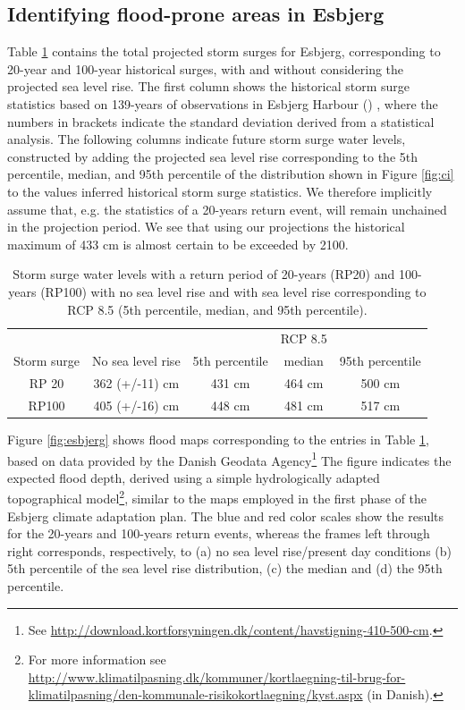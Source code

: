 \documentclass[draft,linenumbers]{agujournal}
\begin{document}
\subsection{Identifying flood-prone areas in Esbjerg}
Table \ref{tab:stormsurge} contains the total projected storm surges for Esbjerg, corresponding to 20-year and 100-year historical surges, with and without considering the projected sea level rise. The first column shows the historical storm surge statistics based on 139-years of observations in Esbjerg Harbour (\citep{sealevel2012}) , where the numbers in brackets indicate the standard deviation derived from a statistical analysis. The following columns indicate future storm surge water levels, constructed by adding the projected sea level rise corresponding to the 5th percentile, median, and 95th percentile of the distribution shown in Figure \ref{fig:ci} to the values inferred historical storm surge statistics. We therefore implicitly assume that, e.g. the statistics of a 20-years return event, will remain unchained in the projection period.  We see that using our projections the historical maximum of 433 cm is almost certain to be exceeded by 2100.

\begin{table}

\begin{center}
\begin{tabular}[]{c | c | c c c}

&&&RCP 8.5&\\
Storm surge&No sea level rise&5th percentile&median&95th percentile\\
\hline
RP 20&362 (+/-11) cm&431 cm&464 cm& 500 cm\\
RP100&405 (+/-16) cm&448 cm& 481 cm& 517 cm\\
\hline
\end{tabular}
\end{center}
\caption{Storm surge water levels \citep{sealevel2012} with a return period of 20-years (RP20) and 100-years (RP100) with no sea level rise  and with sea level rise corresponding to RCP 8.5 (5th percentile, median, and 95th percentile).}
\label{tab:stormsurge}
\end{table} 

Figure \ref{fig:esbjerg} shows flood maps corresponding to the entries in Table \ref{tab:stormsurge}, based on data provided by the Danish Geodata Agency\footnote{See \url{http://download.kortforsyningen.dk/content/havstigning-410-500-cm}.} The figure indicates the expected flood depth, derived using a simple hydrologically adapted topographical model\footnote{For more information see \url{http://www.klimatilpasning.dk/kommuner/kortlaegning-til-brug-for-klimatilpasning/den-kommunale-risikokortlaegning/kyst.aspx} (in Danish).}, similar to the maps employed in the first phase of the Esbjerg climate adaptation plan. The blue and red color scales show the results for the 20-years and 100-years return events, whereas the frames left through right corresponds, respectively, to (a) no sea level rise/present day conditions (b) 5th percentile of the sea level rise distribution, (c) the median and (d) the 95th percentile.
\end{document}
